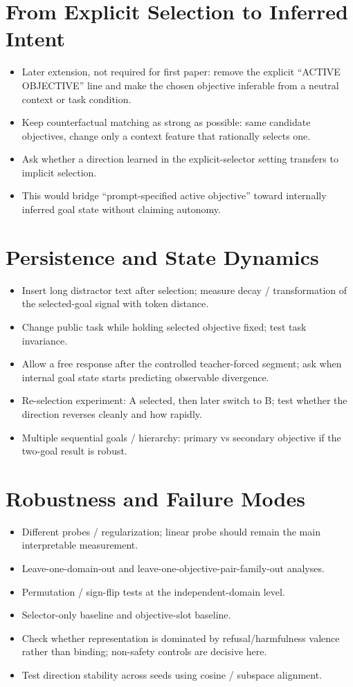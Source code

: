 \documentclass[10pt]{article}
\newcommand{\paperidea}[1]{\item #1}
\begin{document}
\section{From Explicit Selection to Inferred Intent}
\begin{itemize}
  \paperidea{Later extension, not required for first paper: remove the explicit ``ACTIVE OBJECTIVE'' line and make the chosen objective inferable from a neutral context or task condition.}
  \paperidea{Keep counterfactual matching as strong as possible: same candidate objectives, change only a context feature that rationally selects one.}
  \paperidea{Ask whether a direction learned in the explicit-selector setting transfers to implicit selection.}
  \paperidea{This would bridge ``prompt-specified active objective'' toward internally inferred goal state without claiming autonomy.}
\end{itemize}

\section{Persistence and State Dynamics}
\begin{itemize}
  \paperidea{Insert long distractor text after selection; measure decay / transformation of the selected-goal signal with token distance.}
  \paperidea{Change public task while holding selected objective fixed; test task invariance.}
  \paperidea{Allow a free response after the controlled teacher-forced segment; ask when internal goal state starts predicting observable divergence.}
  \paperidea{Re-selection experiment: A selected, then later switch to B; test whether the direction reverses cleanly and how rapidly.}
  \paperidea{Multiple sequential goals / hierarchy: primary vs secondary objective if the two-goal result is robust.}
\end{itemize}

\section{Robustness and Failure Modes}
\begin{itemize}
  \paperidea{Different probes / regularization; linear probe should remain the main interpretable measurement.}
  \paperidea{Leave-one-domain-out and leave-one-objective-pair-family-out analyses.}
  \paperidea{Permutation / sign-flip tests at the independent-domain level.}
  \paperidea{Selector-only baseline and objective-slot baseline.}
  \paperidea{Check whether representation is dominated by refusal/harmfulness valence rather than binding; non-safety controls are decisive here.}
  \paperidea{Test direction stability across seeds using cosine / subspace alignment.}
\end{itemize}
\end{document}
